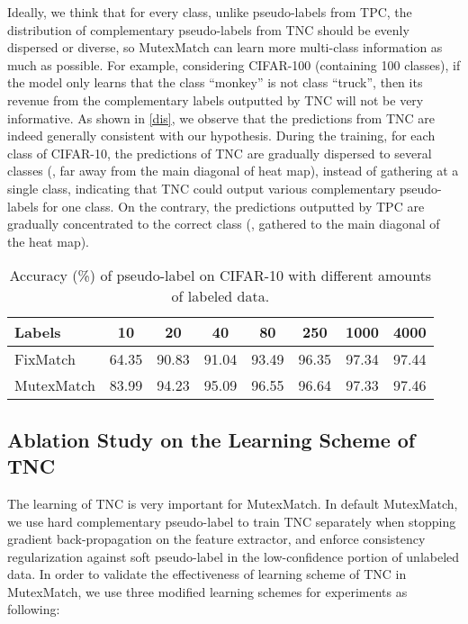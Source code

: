 \documentclass[lettersize,journal]{IEEEtran}
\theoremstyle{plain}
\theoremstyle{definition}
\theoremstyle{remark}
\begin{document}
Ideally, we think that for every class, unlike pseudo-labels from TPC, 
the distribution of complementary pseudo-labels from TNC should be evenly dispersed or diverse,
so MutexMatch can learn more multi-class information as much as possible. For example, considering CIFAR-100 (containing 100 classes), if the model only learns that the class
``monkey'' is not class ``truck'', then its revenue from the complementary labels outputted by TNC will not be very informative. 
As shown in \cref{dis}, we observe that the predictions from TNC are indeed generally consistent with our hypothesis. During the training, for each class of CIFAR-10,
the predictions of TNC are gradually dispersed to several classes (\ie, far away from the main diagonal of heat map), 
instead of gathering at a single class, indicating that TNC could output various complementary pseudo-labels for one class. 
On the contrary, the predictions outputted by TPC are gradually concentrated to the correct class (\ie, gathered to the main diagonal of the heat map). 
\begin{table}[t]
\centering
   \footnotesize
   \caption{Accuracy (\%) of pseudo-label on CIFAR-10 with different amounts of labeled data.} 
   \label{ap1}
\begin{tabular}{@{}lccccccc@{}}
   \toprule
   Labels    & 10      & 20     & 40     & 80  & 250  &1000   &4000   \\ \midrule
   FixMatch & 64.35 & 90.83 & 91.04  & 93.49 &96.35 &97.34  &97.44 \\ 
   MutexMatch & 83.99 & 94.23 & 95.09 & 96.55 &96.64 &97.33  &97.46\\\bottomrule
   \end{tabular}
\end{table}
\subsection{Ablation Study on the Learning Scheme of TNC}
\label{abl:strategy}
The learning of TNC is very important for MutexMatch. In default MutexMatch, we use hard complementary pseudo-label   to train TNC separately when stopping gradient back-propagation on the feature extractor, 
and enforce consistency regularization against soft pseudo-label  in the low-confidence portion of unlabeled data. In order to validate the effectiveness of learning scheme of TNC in MutexMatch, we use three modified learning schemes for experiments as following:
\end{document}
